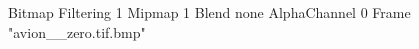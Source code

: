 {Bitmap
	{Filtering 1}
	{Mipmap 1}
	{Blend none}
	{AlphaChannel 0}
	{Frame "avion__zero.tif.bmp"}
}
